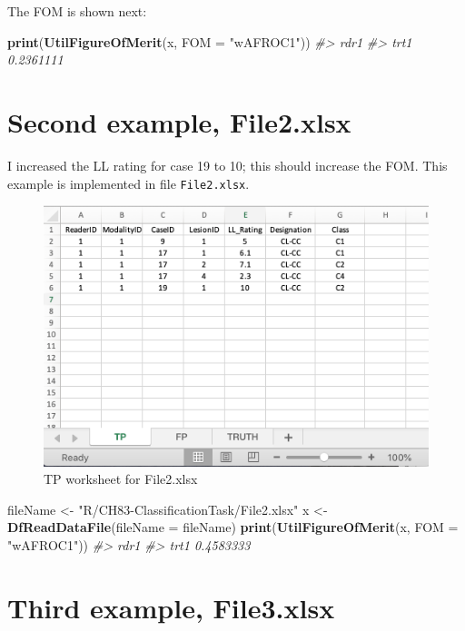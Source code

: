 \documentclass[
]{book}
\newenvironment{Shaded}{\begin{snugshade}}{\end{snugshade}}
\newcommand{\CommentTok}[1]{\textcolor[rgb]{0.56,0.35,0.01}{\textit{#1}}}
\newcommand{\DataTypeTok}[1]{\textcolor[rgb]{0.13,0.29,0.53}{#1}}
\newcommand{\KeywordTok}[1]{\textcolor[rgb]{0.13,0.29,0.53}{\textbf{#1}}}
\newcommand{\NormalTok}[1]{#1}
\newcommand{\StringTok}[1]{\textcolor[rgb]{0.31,0.60,0.02}{#1}}
\begin{document}
The FOM is shown next:

\begin{Shaded}
\begin{Highlighting}[]
\KeywordTok{print}\NormalTok{(}\KeywordTok{UtilFigureOfMerit}\NormalTok{(x, }\DataTypeTok{FOM =} \StringTok{"wAFROC1"}\NormalTok{))}
\CommentTok{#>           rdr1}
\CommentTok{#> trt1 0.2361111}
\end{Highlighting}
\end{Shaded}

\hypertarget{classification-tasks-example2}{%
\section{Second example, File2.xlsx}\label{classification-tasks-example2}}

I increased the LL rating for case 19 to 10; this should increase the FOM. This example is implemented in file \texttt{File2.xlsx}.

\begin{figure}

{\centering \includegraphics[width=0.5\linewidth,height=0.2\textheight]{images/classification/File2TP} 

}

\caption{TP worksheet for File2.xlsx}\label{fig:File2TP}
\end{figure}

\begin{Shaded}
\begin{Highlighting}[]
\NormalTok{fileName <-}\StringTok{ "R/CH83-ClassificationTask/File2.xlsx"}
\NormalTok{x <-}\StringTok{ }\KeywordTok{DfReadDataFile}\NormalTok{(}\DataTypeTok{fileName =}\NormalTok{ fileName)}
\KeywordTok{print}\NormalTok{(}\KeywordTok{UtilFigureOfMerit}\NormalTok{(x, }\DataTypeTok{FOM =} \StringTok{"wAFROC1"}\NormalTok{))}
\CommentTok{#>           rdr1}
\CommentTok{#> trt1 0.4583333}
\end{Highlighting}
\end{Shaded}

\hypertarget{classification-tasks-example3}{%
\section{Third example, File3.xlsx}\label{classification-tasks-example3}}
\end{document}
